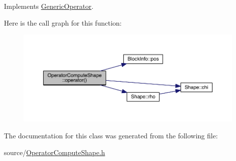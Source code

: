 Implements \hyperlink{class_generic_operator_aacd69e70a1e2d75b97358fca48689a67}{Generic\+Operator}.



Here is the call graph for this function\+:\nopagebreak
\begin{figure}[H]
\begin{center}
\leavevmode
\includegraphics[width=350pt]{d1/dd9/class_operator_compute_shape_ad9d3edd854162a93b5c7212bd694e73a_cgraph}
\end{center}
\end{figure}




The documentation for this class was generated from the following file\+:\begin{DoxyCompactItemize}
\item 
source/\hyperlink{_operator_compute_shape_8h}{Operator\+Compute\+Shape.\+h}\end{DoxyCompactItemize}
